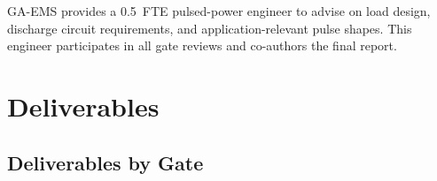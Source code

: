 \documentclass[11pt]{article}
\begin{document}
GA-EMS provides a 0.5~FTE pulsed-power engineer to advise on load
design, discharge circuit requirements, and application-relevant
pulse shapes. This engineer participates in all gate reviews and
co-authors the final report.

\section{Deliverables}
\label{sec:deliverables}

\subsection{Deliverables by Gate}
\end{document}
